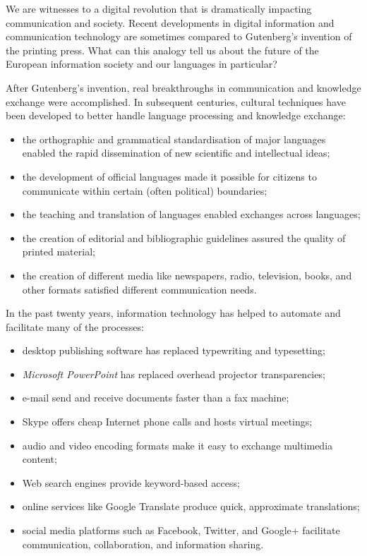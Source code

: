 \begin{multicols}{2}

We are witnesses to a digital revolution that is dramatically impacting communication and society. Recent developments in digital information and communication technology are sometimes compared to Gutenberg’s invention of the printing press. What can this analogy tell us about the future of the European information society and our languages in particular?


After Gutenberg’s invention, real breakthroughs in communication and knowledge exchange were accomplished. In subsequent centuries, cultural techniques have been developed to better handle language processing and knowledge exchange:

    \begin{itemize}
      \item the orthographic and grammatical standardisation of major languages enabled the rapid dissemination of new 
      scientific and intellectual ideas;
      \item the development of official languages made it possible for citizens to communicate within certain (often 
      political) boundaries;
      \item the teaching and translation of languages enabled exchanges across languages;
      \item the creation of editorial and bibliographic guidelines assured the quality of printed 
      material;
      \item the creation of different media like newspapers, radio, television, books, and other formats satisfied 
      different communication needs. 
    \end{itemize}

In the past twenty years, information technology has helped to automate and facilitate many of the processes:

    \begin{itemize}
      \item desktop publishing software has replaced typewriting and typesetting;
      \item \textit{Microsoft PowerPoint} has replaced overhead projector transparencies;
      \item e-mail send and receive documents faster than a fax machine;
      \item Skype offers cheap Internet phone calls and hosts virtual meetings;
      \item audio and video encoding formats make it easy to exchange multimedia content;
      \item Web search engines provide keyword-based access;
      \item online services like Google Translate produce quick, approximate translations;
      \item social media platforms such as Facebook, Twitter, and Google+ facilitate communication, collaboration, and information sharing.
    \end{itemize}


\end{multicols}
